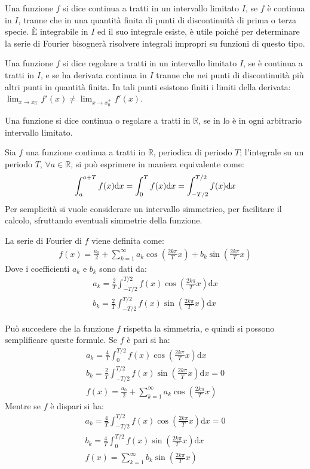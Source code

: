 \documentclass{article}
\newcommand{\df}{\mathrm{d}}
\newcommand{\intab}[4]{\displaystyle\int_{#1}^{#2}{#3}\df{#4}}
\numberwithin{equation}{subsection}
\begin{document}
Una funzione $f$ si dice continua a tratti in un intervallo limitato $I$, se $f$ è continua in $I$, tranne che in una quantità finita di punti di discontinuità di prima o terza specie. 
È integrabile in $I$ ed il suo integrale esiste, è utile poiché per determinare la serie di Fourier bisognerà risolvere integrali impropri su funzioni di questo tipo. 


Una funzione $f$ si dice regolare a tratti in un intervallo limitato $I$, se è continua a tratti in $I$, e se ha derivata continua in $I$ tranne che nei punti di discontinuità più altri punti in quantità finita. In tali punti esistono finiti i limiti della derivata: $\lim_{x\to x_0^-}f'(x)\neq\lim_{x\to x_0^+}f'(x)$. 

Una funzione si dice continua o regolare a tratti in $\mathbb{R}$, se in lo è in ogni arbitrario intervallo limitato. 


Sia $f$ una funzione continua a tratti in $\mathbb{R}$, periodica di periodo $T$; l'integrale su un periodo $T$, $\forall a\in\mathbb{R}$, si può esprimere in maniera equivalente come:
\begin{gather*}
    \displaystyle\intab{a}{a+T}{f(x)}{x}=
    \displaystyle\intab{0}{T}{f(x)}{x}=
    \displaystyle\intab{-T/2}{T/2}{f(x)}{x}
\end{gather*}
Per semplicità si vuole considerare un intervallo simmetrico, per facilitare il calcolo, sfruttando eventuali simmetrie della funzione. 


La serie di Fourier di $f$ viene definita come:
\begin{gather}
    f(x)=\displaystyle\frac{a_0}{2}+\sum_{k=1}^\infty a_k\cos\left(\frac{2k\pi}{T}x\right)+b_k\sin\left(\frac{2k\pi}{T}x\right)
\end{gather}
Dove i coefficienti $a_k$ e $b_k$ sono dati da:
\begin{gather}
    a_k=\displaystyle\frac{2}{T}\int_{-T/2}^{T/2}f(x)\cos\left(\frac{2k\pi}{T}x\right)\df x\\
    b_k=\displaystyle\frac{2}{T}\int_{-T/2}^{T/2}f(x)\sin\left(\frac{2k\pi}{T}x\right)\df x
\end{gather}

Può succedere che la funzione $f$ rispetta la simmetria, e quindi si possono semplificare queste formule. Se $f$ è pari si ha:
\begin{gather*}
    a_k=\displaystyle\frac{4}{T}\int_{0}^{T/2}f(x)\cos\left(\frac{2k\pi}{T}x\right)\df x\\
    b_k=\displaystyle\frac{2}{T}\int_{-T/2}^{T/2}f(x)\sin\left(\frac{2k\pi}{T}x\right)\df x=0\\
    f(x)=\displaystyle\frac{a_0}{2}+\sum_{k=1}^\infty a_k\cos\left(\frac{2k\pi}{T}x\right)
\end{gather*}
Mentre se $f$ è dispari si ha:
\begin{gather*}
    a_k=\displaystyle\frac{4}{T}\int_{-T/2}^{T/2}f(x)\cos\left(\frac{2k\pi}{T}x\right)\df x=0\\
    b_k=\displaystyle\frac{4}{T}\int_{0}^{T/2}f(x)\sin\left(\frac{2k\pi}{T}x\right)\df x\\
    f(x)=\displaystyle\sum_{k=1}^\infty b_k\sin\left(\frac{2k\pi}{T}x\right)
\end{gather*}
\end{document}

